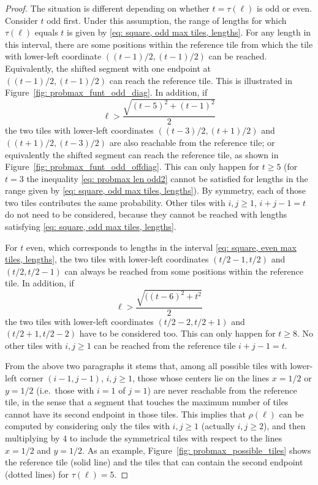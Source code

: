 \documentclass[12pt, a4paper]{article}
\newcommand{\funt}{\tau} %
\newcommand{\probmax}{\rho} %
\newcommand{\len}{\ell} %
\newcommand{\tiles}{t} %
\begin{document}
\begin{proof}
The situation is different depending on whether $\tiles = \funt(\len)$ is odd or even. Consider $\tiles$ odd first. Under this assumption, the range of lengths for which $\funt(\len)$ equals $\tiles$ is given by \eqref{eq: square, odd max tiles, lengths}. For any length in this interval, there are some positions within the reference tile from which the tile with lower-left coordinate $((\tiles-1)/2, (\tiles-1)/2)$ can be reached. Equivalently, the shifted segment with one endpoint at $((\tiles-1)/2, (\tiles-1)/2)$ can reach the reference tile. This is illustrated in Figure~\ref{fig: probmax_funt_odd_diag}. In addition, if 
\begin{equation}
\label{eq: probmax len odd2}
\len > \frac{\sqrt{(\tiles-5)^2 + (\tiles-1)^2}}{2}
\end{equation}
the two tiles with lower-left coordinates $((\tiles-3)/2, (\tiles+1)/2)$ and $((\tiles+1)/2, (\tiles-3)/2)$ are also reachable from the reference tile; or equivalently the shifted segment can reach the reference tile, as shown in Figure~\ref{fig: probmax_funt_odd_offdiag}. This can only happen for $\tiles \geq 5$ (for $\tiles=3$ the inequality \eqref{eq: probmax len odd2} cannot be satisfied for lengths in the range given by \eqref{eq: square, odd max tiles, lengths}). By symmetry, each of those two tiles contributes the same probability. Other tiles with $i,j\geq 1$, $i+j-1 = \tiles$ do not need to be considered, because they cannot be reached with lengths satisfying \eqref{eq: square, odd max tiles, lengths}.

For $\tiles$ even, which corresponds to lengths in the interval \eqref{eq: square, even max tiles, lengths}, the two tiles with lower-left coordinates $(\tiles/2-1, \tiles/2)$ and $(\tiles/2, \tiles/2-1)$ can always be reached from some positions within the reference tile. In addition, if
\begin{equation}
\label{eq: probmax len even2}
\len > \frac{\sqrt{((\tiles-6)^2 + \tiles^2}}{2}
\end{equation}
the two tiles with lower-left coordinates $(\tiles/2-2, \tiles/2+1)$ and $(\tiles/2+1, \tiles/2-2)$ have to be considered too. This can only happen for $\tiles \geq 8$. No other tiles with $i,j\geq 1$ can be reached from the reference tile $i+j-1 = \tiles$.

From the above two paragraphs it stems that, among all possible tiles with lower-left corner $(i-1,j-1)$, $i,j\geq 1$, those whose centers lie on the lines $x=1/2$ or $y=1/2$ (i.e.~those with $i=1$ of $j=1$) are never reachable from the reference tile, in the sense that a segment that touches the maximum number of tiles cannot have its second endpoint in those tiles. This implies that $\probmax(\len)$ can be computed by considering only the tiles with $i,j\geq 1$ (actually $i,j \geq 2$), and then multiplying by $4$ to include the symmetrical tiles with respect to the lines $x=1/2$ and $y=1/2$. As an example, Figure~\ref{fig: probmax_possible_tiles} shows the reference tile (solid line) and the tiles that can contain the second endpoint (dotted lines) for $\funt(\len) = 5$.


\end{proof}
\end{document}
